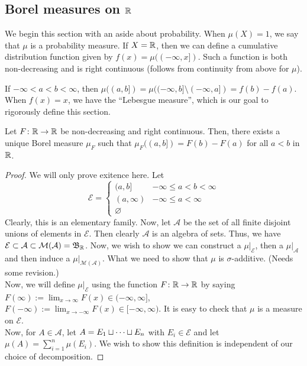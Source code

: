 \documentclass[11pt,leqno,oneside]{amsbook}
\numberwithin{thm}{section}
\renewcommand{\A}{\mathcal{A}} %
\newcommand{\M}{\mathcal{M}} %
\newcommand{\Ep}{\mathcal{E}} %
\newcommand{\s}{$\sigma$-} %
\renewcommand{\emptyset}{\varnothing}
\begin{document}
\subsection{Borel measures on ${\mathbb R}$}
We begin this section with an aside about probability. When $\mu(X) =
1$, we say that $\mu$ is a probability measure. If $X={\mathbb R}$, then we can
define a cumulative distribution function given by $f(x) =
\mu((-\infty,x])$. Such a function is both non-decreasing and is right
continuous (follows from continuity from above for $\mu$).
\begin{rmk}
  If $-\infty < a < b < \infty$, then $\mu((a,b]) = \mu((-\infty,b]
  \setminus (-\infty,a]) = f(b) - f(a)$. When $f(x) = x$, we have the
  ``Lebesgue measure'', which is our goal to rigorously define this section.
\end{rmk}
\begin{thm}\label{unique-borel-measure}
  Let $F \colon {\mathbb R} \to {\mathbb R}$ be non-decreasing and right
  continuous. Then, there exists a unique Borel measure $\mu_F$ such
  that $\mu_F((a,b]) = F(b) - F(a)$ for all $a < b$ in ${\mathbb R}$.
\end{thm}
\begin{proof}\let\qed\relax
  We will only prove exitence here. Let \[
    \Ep =
    \begin{cases}
      (a,b] & -\infty \leq a < b < \infty \\
      (a, \infty) & -\infty \leq a < \infty \\
      \emptyset
    \end{cases}
\]
Clearly, this is an elementary family. Now, let $\A$ be the set of all
finite disjoint unions of elements in $\Ep$. Then clearly $\A$ is an
algebra of sets. Thus, we have $\Ep \subset \A \subset \M(\A) =
\B_\R$. Now, we wish to show we can construct a $\mu|_\Ep$, then a
$\mu|_\A$ and then induce a $\mu|_{\M(\A)}$. What we need to show that
$\mu$ is \s additive. (Needs some revision.)\\

Now, we will define $\mu|_\Ep$ using the function $F \colon {\mathbb R} \to {\mathbb R}$
by saying $F(\infty) := \lim_{x \to \infty} F(x) \in
(-\infty,\infty]$, $F(-\infty) := \lim_{x \to -\infty} F(x) \in
[-\infty, \infty)$. It is easy to check that $\mu$ is a measure on
$\Ep$.  \\

Now, for $A \in \A$, let $A = E_1 \sqcup \cdots \sqcup E_n$
with $E_i \in \Ep$ and let $\mu(A) = \sum_{i=1}^n \mu(E_i)$. We wish
to show this definition is independent of our choice of decomposition.
\end{proof}
\end{document}
